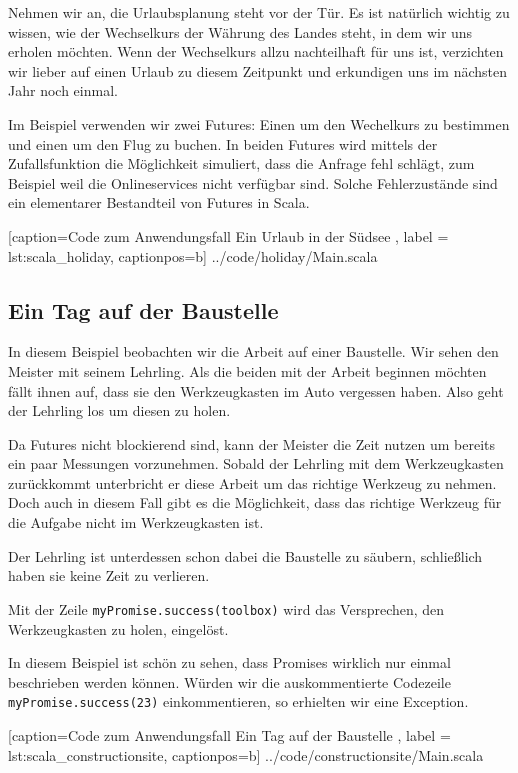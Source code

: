 \documentclass[11pt,a4paper,titlepage,ngerman]{scrartcl}
\begin{document}
Nehmen wir an, die Urlaubsplanung steht vor der Tür. Es ist natürlich wichtig
zu wissen, wie der Wechselkurs der Währung des Landes steht, in dem wir uns
erholen möchten. Wenn der Wechselkurs allzu nachteilhaft für uns ist,
verzichten wir lieber auf einen Urlaub zu diesem Zeitpunkt und erkundigen
uns im nächsten Jahr noch einmal.

Im Beispiel verwenden wir zwei Futures: Einen um den Wechelkurs zu bestimmen
und einen um den Flug zu buchen. In beiden Futures wird mittels der Zufallsfunktion
die Möglichkeit simuliert, dass die Anfrage fehl schlägt, zum Beispiel weil
die Onlineservices nicht verfügbar sind. Solche Fehlerzustände sind ein elementarer
Bestandteil von Futures in Scala.


    [caption={Code zum Anwendungsfall \glqq Ein Urlaub in der Südsee\grqq{} },
       label = lst:scala_holiday,
       captionpos=b]
 {../code/holiday/Main.scala}
 

\subsection{Ein Tag auf der Baustelle}

In diesem Beispiel beobachten wir die Arbeit auf einer Baustelle. Wir sehen
den Meister mit seinem Lehrling. Als die beiden mit der Arbeit beginnen möchten
fällt ihnen auf, dass sie den Werkzeugkasten im Auto vergessen haben. Also
geht der Lehrling los um diesen zu holen.

Da Futures nicht blockierend sind, kann der Meister die Zeit nutzen um bereits
ein paar Messungen vorzunehmen. Sobald der Lehrling mit dem Werkzeugkasten
zurückkommt unterbricht er diese Arbeit um das richtige Werkzeug zu nehmen.
Doch auch in diesem Fall gibt es die Möglichkeit, dass das richtige Werkzeug
für die Aufgabe nicht im Werkzeugkasten ist.

Der Lehrling ist unterdessen schon dabei die Baustelle zu säubern, schließlich
haben sie keine Zeit zu verlieren.

Mit der Zeile \texttt{myPromise.success(toolbox)} wird das Versprechen,
den Werkzeugkasten zu holen, eingelöst.

In diesem Beispiel ist schön zu sehen, dass Promises wirklich nur einmal
beschrieben werden können. Würden wir die auskommentierte Codezeile
\texttt{myPromise.success(23)} einkommentieren, so erhielten wir eine
Exception.


    [caption={Code zum Anwendungsfall \glqq Ein Tag auf der Baustelle\grqq{} },
       label = lst:scala_constructionsite,
       captionpos=b]
 {../code/constructionsite/Main.scala}
\end{document}
